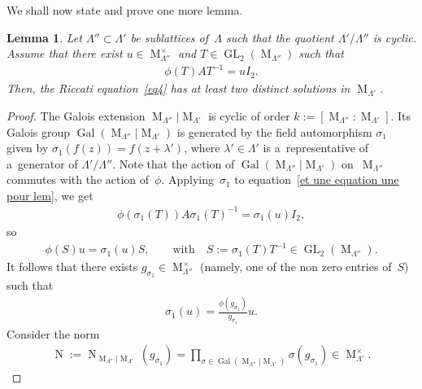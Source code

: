 \documentclass[pdftex]{sigma}
\numberwithin{equation}{section}
\newtheorem{Lemma}[Theorem]{Lemma}
\begin{document}
We shall now state and prove one more lemma.

\begin{Lemma}
\label{lem descente}
Let $\Lambda'' \subset \Lambda'$ be sublattices of~$\Lambda$ such that the quotient $\Lambda'/\Lambda''$ is cyclic.
Assume that there exist $u \in \operatorname{M}_{\Lambda''}^{\times}$ and $T \in
\operatorname{GL}_{2}(\operatorname{M}_{\Lambda''})$ such that
\begin{gather}
\label{et une equation une pour lem}
\phi(T)AT^{-1}=u I_{2}.
\end{gather}
Then, the Riccati equation~\eqref{eq4} has at least two distinct solutions in $\operatorname{M}_{\Lambda'}$.
\end{Lemma}

\begin{proof}
The Galois extension $ \operatorname{M}_{\Lambda''} \vert \operatorname{M}_{\Lambda'} $ is cyclic of order
$k:=[\operatorname{M}_{\Lambda''}: \operatorname{M}_{\Lambda'}]$.
Its Galois group $\operatorname{Gal}(\operatorname{M}_{\Lambda''}|\operatorname{M}_{\Lambda'})$ is generated by the
f\/ield automorphism $\sigma_{1}$ given by $\sigma_{1}(f(z))=f(z+\lambda')$, where $\lambda' \in \Lambda'$ is
a~representative of a~generator of $\Lambda'/\Lambda''$.
Note that the action of $\operatorname{Gal}(\operatorname{M}_{\Lambda''}|\operatorname{M}_{\Lambda'})$ on~$\operatorname{M}_{\Lambda''}$ commutes with the action of~$\phi$.
Applying~$\sigma_{1}$ to equation~\eqref{et une equation une pour lem}, we get
\begin{gather*}
\phi(\sigma_{1} (T))A\sigma_{1}(T)^{-1}=\sigma_{1}(u) I_{2},
\end{gather*}
so
\begin{gather*}
\phi(S)u=\sigma_{1}(u) S, \qquad \text{with} \quad S:=\sigma_{1}(T) T^{-1} \in \operatorname{GL}_{2}(\operatorname{M}_{\Lambda''}).
\end{gather*}
It follows that there exists $g_{\sigma_{1}}\in \operatorname{M}_{\Lambda''}^{\times}$ (namely, one of the non zero
entries of~$S$) such that
\begin{gather*}
\sigma_{1}(u)=\frac{\phi (g_{\sigma_{1}})}{g_{\sigma_{1}}}u.
\end{gather*}
Consider the norm
\begin{gather*}
\operatorname{N}:=\operatorname{N}_{\operatorname{M}_{\Lambda''}|\operatorname{M}_{\Lambda'}}(g_{\sigma_1})=
\prod\limits_{\sigma \in \operatorname{Gal}(\operatorname{M}_{\Lambda''}|\operatorname{M}_{\Lambda'})} \sigma
(g_{\sigma_1}) \in \operatorname{M}_{\Lambda'}^{\times}.

\end{gather*}
\end{proof}
\end{document}
